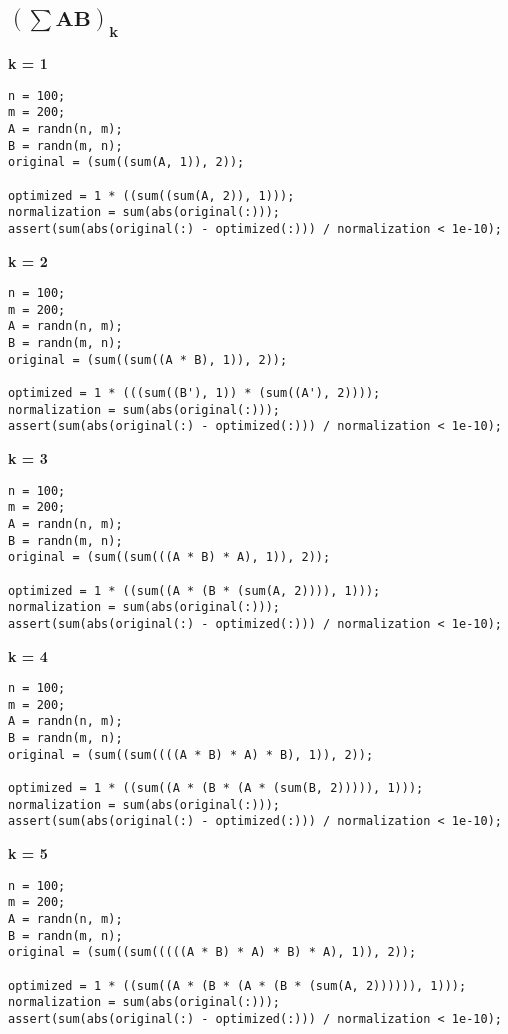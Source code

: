 \subsection{$\mathbf{(\sum AB)_k}$}



{\bf k = 1}

\begin{lstlisting}
n = 100;
m = 200;
A = randn(n, m);
B = randn(m, n);
original = (sum((sum(A, 1)), 2));

optimized = 1 * ((sum((sum(A, 2)), 1)));
normalization = sum(abs(original(:)));
assert(sum(abs(original(:) - optimized(:))) / normalization < 1e-10);
\end{lstlisting}


{\bf k = 2}

\begin{lstlisting}
n = 100;
m = 200;
A = randn(n, m);
B = randn(m, n);
original = (sum((sum((A * B), 1)), 2));

optimized = 1 * (((sum((B'), 1)) * (sum((A'), 2))));
normalization = sum(abs(original(:)));
assert(sum(abs(original(:) - optimized(:))) / normalization < 1e-10);
\end{lstlisting}


{\bf k = 3}

\begin{lstlisting}
n = 100;
m = 200;
A = randn(n, m);
B = randn(m, n);
original = (sum((sum(((A * B) * A), 1)), 2));

optimized = 1 * ((sum((A * (B * (sum(A, 2)))), 1)));
normalization = sum(abs(original(:)));
assert(sum(abs(original(:) - optimized(:))) / normalization < 1e-10);
\end{lstlisting}


{\bf k = 4}

\begin{lstlisting}
n = 100;
m = 200;
A = randn(n, m);
B = randn(m, n);
original = (sum((sum((((A * B) * A) * B), 1)), 2));

optimized = 1 * ((sum((A * (B * (A * (sum(B, 2))))), 1)));
normalization = sum(abs(original(:)));
assert(sum(abs(original(:) - optimized(:))) / normalization < 1e-10);
\end{lstlisting}


{\bf k = 5}

\begin{lstlisting}
n = 100;
m = 200;
A = randn(n, m);
B = randn(m, n);
original = (sum((sum(((((A * B) * A) * B) * A), 1)), 2));

optimized = 1 * ((sum((A * (B * (A * (B * (sum(A, 2)))))), 1)));
normalization = sum(abs(original(:)));
assert(sum(abs(original(:) - optimized(:))) / normalization < 1e-10);
\end{lstlisting}


